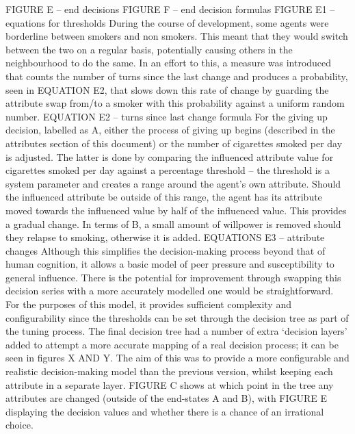 \documentclass[]{report}
\begin{document}
FIGURE E – end decisions
FIGURE F – end decision formulas
FIGURE E1 – equations for thresholds
During the course of development, some agents were borderline between smokers and non smokers. This meant that they would switch between the two on a regular basis, potentially causing others in the neighbourhood to do the same. In an effort to this, a measure was introduced that counts the number of turns since the last change and produces a probability, seen in EQUATION E2, that slows down this rate of change by guarding the attribute swap from/to a smoker with this probability against a uniform random number.
EQUATION E2 – turns since last change formula
For the giving up decision, labelled as A, either the process of giving up begins (described in the attributes section of this document) or the number of cigarettes smoked per day is adjusted. The latter is done by comparing the influenced attribute value for cigarettes smoked per day against a percentage threshold – the threshold is a system parameter and creates a range around the agent's own attribute. Should the influenced attribute be outside of this range, the agent has its attribute moved towards the influenced value by half of the influenced value. This provides a gradual change. In terms of B, a small amount of willpower is removed should they relapse to smoking, otherwise it is added.
EQUATIONS E3 – attribute changes
Although this simplifies the decision-making process beyond that of human cognition, it allows a basic model of peer pressure and susceptibility to general influence. There is the potential for improvement through swapping this decision series with a more accurately modelled one would be straightforward. For the purposes of this model, it provides sufficient complexity and configurability since the thresholds can be set through the decision tree as part of the tuning process.
The final decision tree had a number of extra `decision layers' added to attempt a more accurate mapping of a real decision process; it can be seen in figures X AND Y. The aim of this was to provide a more configurable and realistic decision-making model than the previous version, whilst keeping each attribute in a separate layer. FIGURE C shows at which point in the tree any attributes are changed (outside of the end-states A and B), with FIGURE E displaying the decision values and whether there is a chance of an irrational choice.
\end{document}
